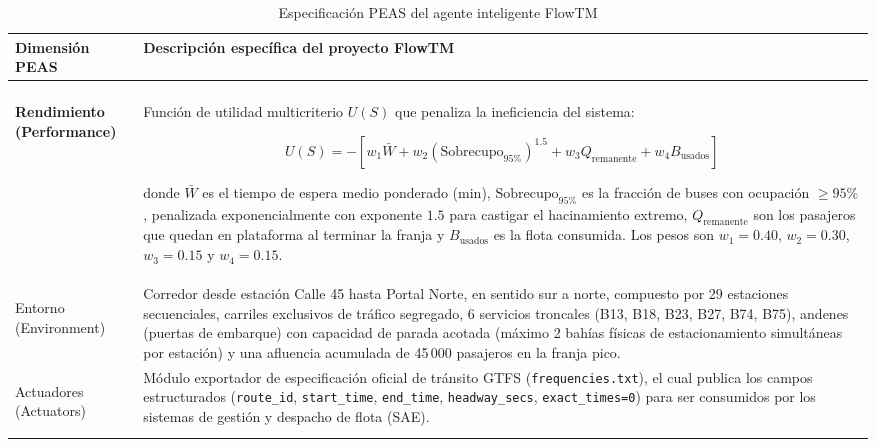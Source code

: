 \documentclass{article}
\begin{document}
\begin{longtable}{|>{\bfseries}p{} |p{}|}
    \caption{Especificación PEAS del agente inteligente FlowTM}
    \label{tab:peas-flowtm} \\

    \toprule
    \textbf{Dimensión PEAS} & \textbf{Descripción específica del proyecto FlowTM} \\
    \midrule
    \endfirsthead

    \endhead

    \midrule
    \multicolumn{2}{r}{{Continúa en la siguiente página}} \\
    \endfoot

    \bottomrule
    \endlastfoot

    \textbf{Rendimiento (Performance)}
    &
    Función de utilidad multicriterio \(U(S)\) que penaliza la ineficiencia
    del sistema:

    \[
        U(S) =
        -\left[
        w_1 \bar{W}
        + w_2(\mathrm{Sobrecupo}_{95\%})^{1.5}
        + w_3 Q_{\mathrm{remanente}}
        + w_4 B_{\mathrm{usados}}
        \right]
    \]

    donde \(\bar{W}\) es el tiempo de espera medio ponderado (min),
    \(\mathrm{Sobrecupo}_{95\%}\) es la fracción de buses con ocupación
    \(\geq 95\%\), penalizada exponencialmente con exponente \(1.5\) para
    castigar el hacinamiento extremo, \(Q_{\mathrm{remanente}}\) son los
    pasajeros que quedan en plataforma al terminar la franja y
    \(B_{\mathrm{usados}}\) es la flota consumida. Los pesos son
    \(w_1=0.40\), \(w_2=0.30\), \(w_3=0.15\) y \(w_4=0.15\).
    \\ \hline 

    Entorno (Environment)
    &
    Corredor desde estación Calle 45 hasta Portal Norte, en sentido sur a
    norte, compuesto por 29 estaciones secuenciales, carriles
    exclusivos de tráfico segregado, 6 servicios troncales
    (B13, B18, B23, B27, B74, B75), andenes (puertas de embarque) con
    capacidad de parada acotada (máximo 2 bahías físicas de
    estacionamiento simultáneas por estación) y una afluencia acumulada
    de 45\,000 pasajeros en la franja pico.
    \\ \hline

    Actuadores (Actuators)
    &
    Módulo exportador de especificación oficial de tránsito GTFS
    (\texttt{frequencies.txt}), el cual publica los campos estructurados
    (\texttt{route\_id}, \texttt{start\_time}, \texttt{end\_time},
    \texttt{headway\_secs}, \texttt{exact\_times=0}) para ser consumidos
    por los sistemas de gestión y despacho de flota (SAE).
    \\ \hline


\end{longtable}
\end{document}
